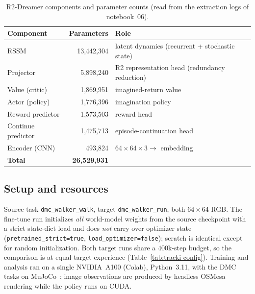 \documentclass[11pt,a4paper]{article}
\begin{document}
\begin{table}[h]
\centering\small
\begin{tabular}{lrl}
\toprule
Component & Parameters & Role \\
\midrule
RSSM               & 13{,}442{,}304 & latent dynamics (recurrent + stochastic state) \\
Projector          &  5{,}898{,}240 & R2 representation head (redundancy reduction) \\
Value (critic)     &  1{,}869{,}951 & imagined-return value \\
Actor (policy)     &  1{,}776{,}396 & imagination policy \\
Reward predictor   &  1{,}573{,}503 & reward head \\
Continue predictor &  1{,}475{,}713 & episode-continuation head \\
Encoder (CNN)      &    493{,}824 & $64\times64\times3 \rightarrow$ embedding \\
\midrule
\textbf{Total}     & \textbf{26{,}529{,}931} & \\
\bottomrule
\end{tabular}
\caption{R2-Dreamer components and parameter counts (read from the extraction
logs of notebook~06).}
\label{tab:tracki-model}
\end{table}

\subsection{Setup and resources}
\label{sec:tracki-setup}

Source task \texttt{dmc\_walker\_walk}, target \texttt{dmc\_walker\_run}, both
$64{\times}64$ RGB. The fine-tune run initializes \emph{all} world-model weights
from the source checkpoint with a strict state-dict load and does \emph{not}
carry over optimizer state (\texttt{pretrained\_strict=true},
\texttt{load\_optimizer=false}); scratch is identical except for random
initialization. Both target runs share a $400$k-step budget, so the comparison
is at equal target experience (Table~\ref{tab:tracki-config}). Training and
analysis ran on a single NVIDIA~A100 (Colab), Python~3.11, with the DMC tasks on
MuJoCo~\cite{mujoco,dmcontrol}; image observations are produced by headless
OSMesa rendering while the policy runs on CUDA.
\end{document}

